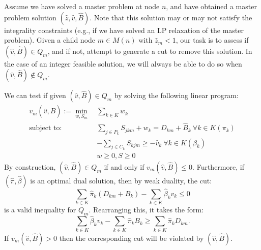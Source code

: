 \documentclass[10pt]{article}
\newcommand{\ka}{k} %
\newcommand{\KA}{K}
\newcommand{\Bi}{B} %
\newcommand{\Vi}{v} %
\newcommand{\Es}{S} %
\newcommand{\Zed}{z} %
\begin{document}
\newcommand{\vsol}{\hat{\Vi}}
\newcommand{\zsol}{\hat{\Zed}}
\newcommand{\bsol}{\hat{\Bi}}
\newcommand{\pisol}{\hat{\pi}}
\newcommand{\betasol}{\hat{\beta}}

Assume we have solved a master problem at node $n$, and have obtained a master problem solution $(\zsol,\vsol,\bsol)$. Note that this solution may or may not satisfy the integrality constraints (e.g., if we have solved an LP relaxation of the master problem). Given a child node $m \in M(n)$ with $\zsol_m < 1$, our task is to assess if $(\vsol,\bsol) \in Q_m$, and if not, attempt to generate a cut to remove this solution. In the case of an integer feasible solution, we will always be able to do so when $(\vsol,\bsol) \notin Q_m$.

We can test if given $(\vsol,\bsol) \in Q_m$ by solving the following linear program:
\begin{align*}
\Vi_m(\vsol,\bsol) :=  \min_{w,\Es_m} \ & \sum_{\ka  \in \KA} w_k \\
    \text{subject to: } & \sum_{j \in P_k} \Es_{jkm} + w_k = D_{km} + \bsol_k \ \forall \ka  \in \KA (\pi_k) \\
    &-\sum_{j \in C_k} \Es_{\ka jm} \geq -\vsol_k \ \forall \ka  \in \KA (\beta_k) \\
    & w \geq 0, S \geq 0
\end{align*}
By construction, $(\vsol,\bsol) \in Q_m$ if and only if $\Vi_m(\vsol,\bsol) \leq 0$. Furthermore, if $(\pisol,\betasol)$ is an optimal dual solution, then by weak duality, the cut:
 \[ \sum_{\ka  \in \KA} \pisol_k (D_{km} + \Bi_k) - \sum_{\ka  \in \KA} \betasol_k \Vi_k \leq 0 \]
is a valid inequality for $Q_m$. Rearranging this, it takes the form:
\[ \sum_{\ka  \in \KA} \betasol_k \Vi_k - \sum_{\ka  \in \KA} \pisol_k \Bi_k  \geq  \sum_{\ka  \in \KA} \pisol_k D_{km}. \]
If $\Vi_m(\vsol,\bsol) > 0$ then the corresponding cut will be violated by $(\vsol,\bsol)$. 
\end{document}
